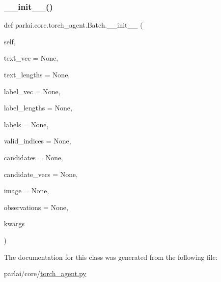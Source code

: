 \subsubsection{\texorpdfstring{\+\_\+\+\_\+init\+\_\+\+\_\+()}{\_\_init\_\_()}}
{\footnotesize\ttfamily def parlai.\+core.\+torch\+\_\+agent.\+Batch.\+\_\+\+\_\+init\+\_\+\+\_\+ (\begin{DoxyParamCaption}\item[{}]{self,  }\item[{}]{text\+\_\+vec = {\ttfamily None},  }\item[{}]{text\+\_\+lengths = {\ttfamily None},  }\item[{}]{label\+\_\+vec = {\ttfamily None},  }\item[{}]{label\+\_\+lengths = {\ttfamily None},  }\item[{}]{labels = {\ttfamily None},  }\item[{}]{valid\+\_\+indices = {\ttfamily None},  }\item[{}]{candidates = {\ttfamily None},  }\item[{}]{candidate\+\_\+vecs = {\ttfamily None},  }\item[{}]{image = {\ttfamily None},  }\item[{}]{observations = {\ttfamily None},  }\item[{}]{kwargs }\end{DoxyParamCaption})}



The documentation for this class was generated from the following file\+:\begin{DoxyCompactItemize}
\item 
parlai/core/\hyperlink{torch__agent_8py}{torch\+\_\+agent.\+py}\end{DoxyCompactItemize}
